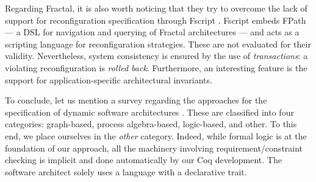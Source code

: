 		Regarding Fractal,  it is also worth noticing that they try to overcome the lack of
	support for reconfiguration specification	 through 
	Fscript \cite{DAVID:2008:HAL-00468474:1}. Fscript embeds FPath --- a DSL for navigation and querying of
	Fractal architectures --- and acts as a scripting language for reconfiguration strategies. These
	are not evaluated for their validity. Nevertheless, system consistency is ensured by the use of
	\textit{transactions}: a violating reconfiguration is \textit{rolled back}.
	Furthermore, an interesting feature is the support for application-specific architectural
	invariants.


		To conclude, let us mention a survey regarding the approaches for the specification of 
	dynamic software architectures \cite{Bradbury:2004:SSD:1075405.1075411}. These are 
	classified into four categories: graph-based, process algebra-based, 
	logic-based, and other. To this end, we place ourselves
	in the \textit{other} category. Indeed, while formal logic is at the foundation of 
	our approach, all the machinery involving requirement/constraint checking is 
	implicit and done automatically by our Coq development. The software architect 
	solely uses a language with a declarative trait. %
	
	
	
		
	
		
	
	
	
    
    





